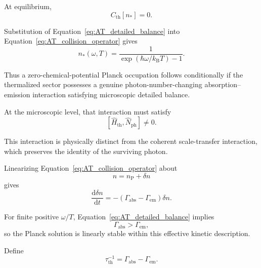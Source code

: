 At equilibrium,
\begin{equation}
    C_{\mathrm{th}}[n_*]
    =
    0.
    \label{eq:AT_collision_equilibrium}
\end{equation}

Substitution of
Equation~\eqref{eq:AT_detailed_balance}
into
Equation~\eqref{eq:AT_collision_operator}
gives
\begin{equation}
    n_*(\omega,T)
    =
    \frac{1}{
        \exp
        \left(
            \hbar\omega/k_{\mathrm B}T
        \right)
        -1
    }.
    \label{eq:AT_Planck_occupation}
\end{equation}

Thus a zero-chemical-potential Planck occupation follows conditionally if the
thermalized sector possesses a genuine photon-number-changing
absorption--emission interaction satisfying microscopic detailed balance.

At the microscopic level, that interaction must satisfy
\begin{equation}
    \left[
        \hat H_{\mathrm{th}},
        \hat N_{\mathrm{ph}}
    \right]
    \neq
    0.
    \label{eq:AT_number_changing_requirement}
\end{equation}

This interaction is physically distinct from the coherent scale-transfer
interaction, which preserves the identity of the surviving photon.

Linearizing
Equation~\eqref{eq:AT_collision_operator}
about
\begin{equation}
    n
    =
    n_{\mathrm P}
    +
    \delta n
\end{equation}
gives
\begin{equation}
    \frac{\mathrm d\delta n}{\mathrm dt}
    =
    -
    \left(
        \Gamma_{\mathrm{abs}}
        -
        \Gamma_{\mathrm{em}}
    \right)
    \delta n.
    \label{eq:AT_Planck_stability}
\end{equation}

For finite positive
\(\omega/T\),
Equation~\eqref{eq:AT_detailed_balance}
implies
\begin{equation}
    \Gamma_{\mathrm{abs}}
    >
    \Gamma_{\mathrm{em}},
\end{equation}
so the Planck solution is linearly stable within this effective kinetic
description.

Define
\begin{equation}
    \tau_{\mathrm{th}}^{-1}
    =
    \Gamma_{\mathrm{abs}}
    -
    \Gamma_{\mathrm{em}}.
    \label{eq:AT_thermalization_rate}
\end{equation}

